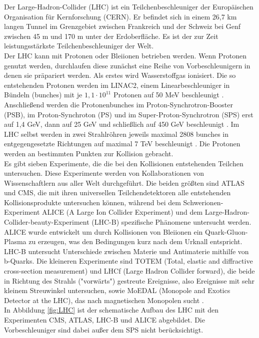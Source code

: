 Der Large-Hadron-Collider (LHC) ist ein Teilchenbeschleuniger der Europ\"aischen Organisation f\"ur Kernforschung (CERN). Er befindet sich in einem 26,7 km langen Tunnel im Grenzgebiet zwischen Frankreich und der Schweiz bei Genf zwischen 45 m und 170 m unter der Erdoberfl\"ache. Es ist der zur Zeit leistungsst\"arkste Teilchenbeschleuniger der Welt.\\
Der LHC kann mit Protonen oder Bleiionen betrieben werden. Wenn Protonen genutzt werden, durchlaufen diese zun\"achst eine Reihe von Vorbeschleunigern in denen sie pr\"apariert werden. Als erstes wird Wasserstoffgas ionisiert. Die so entstehenden Protonen werden im LINAC2, einem Linearbeschleuniger in B\"undeln (bunches) mit je $1,1\cdot 10^{11}$ Protonen auf 50 MeV beschleunigt \cite{O'Luanaigh:1997427}. Anschlie\ss end werden die Protonenbunches im Proton-Synchrotron-Booster (PSB), im Proton-Synchroton (PS) und im Super-Proton-Synchrotron (SPS) erst auf 1,4 GeV, dann auf 25 GeV und schlie\ss lich auf 450 GeV beschleunigt \cite{O'Luanaigh:1997193}. Im LHC selbst werden in zwei Strahlr\"ohren jeweils maximal 2808 bunches in entgegengesetzte Richtungen auf maximal 7 TeV beschleunigt \cite{Lefevre:1165534}. Die Protonen werden an bestimmten Punkten zur Kollision gebracht. \\
Es gibt sieben Experimente, die die bei den Kollisionen entstehenden Teilchen untersuchen. Diese Experimente werden von Kollaborationen von Wissenschaftlern aus aller Welt durchgef\"uhrt. Die beiden gr\"o\ss ten sind ATLAS und CMS, die mit ihren universellen Teilchendetektoren alle entstehenden Kollisionsprodukte untersuchen k\"onnen, w\"ahrend bei dem Schwerionen-Experiment ALICE (A Large Ion Collider Experiment) und dem Large-Hadron-Collider-beauty-Experiment (LHC-B) spezifische Ph\"anomene untersucht werden. ALICE wurde entwickelt um durch Kollisionen von Bleiionen ein Quark-Gluon-Plasma zu erzeugen, was den Bedingungen kurz nach dem Urknall entspricht. LHC-B untersucht Unterschiede zwischen Materie und Antimaterie mithilfe von b-Quarks. Die kleineren Experimente sind TOTEM (Total, elastic and diffractive cross-section measurement) und LHCf (Large Hadron Collider forward), die beide in Richtung des Strahls ("vorw\"arts") gestreute Ereignisse, also Ereignisse mit sehr kleinem Streuwinkel untersuchen, sowie MoEDAL (Monopole and Exotics Detector at the LHC), das nach magnetischen Monopolen sucht \cite{O'Luanaigh:1997374, O'Luanaigh:1997265, O'Luanaigh:1997262, O'Luanaigh:1997259, O'Luanaigh:1997373, O'Luanaigh:1997527}.\\
In Abbildung \ref{fig:LHC} ist der schematische Aufbau des LHC mit den Experimenten CMS, ATLAS, LHC-B und ALICE abgebildet. Die Vorbeschleuniger sind dabei au\ss er dem SPS nicht ber\"ucksichtigt.

